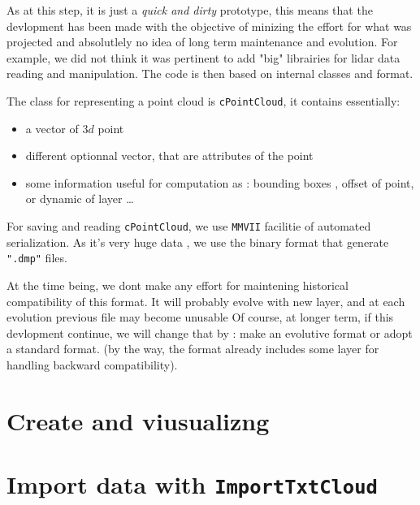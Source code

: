 As at this step, it is just a \emph{quick and dirty} prototype, this means that the
devlopment has been made with the objective of minizing the effort for what
was projected and absolutlely no idea of long term maintenance and evolution.
For example, we did not  think it 
was pertinent to add "big" librairies for lidar data reading and manipulation.
The code is then based on internal classes and format.

The class for representing a point cloud is {\tt cPointCloud}, it contains essentially:

\begin{itemize}
  \item  a vector of $3d$ point
  \item different optionnal vector, that are attributes of the point
  \item  some information useful for computation as : bounding boxes , offset of point,
         or dynamic of layer \dots
\end{itemize}

For saving and reading  {\tt cPointCloud}, we use {\tt MMVII} facilitie of
automated serialization.  As it's very huge data , we use the binary
format that generate {\tt ".dmp"} files.

At the time being, we  dont make any effort for maintening historical compatibility
of this format.  It will probably evolve with new layer, and at each evolution
previous file may become unusable 
 Of course, at longer term, if this devlopment
continue, we will change that by : make an evolutive format or adopt a standard format.
 (by the way,  the format already includes some layer for handling backward compatibility).


\section{Create and viusualizng}



\section{Import   data with  {\tt ImportTxtCloud}}

